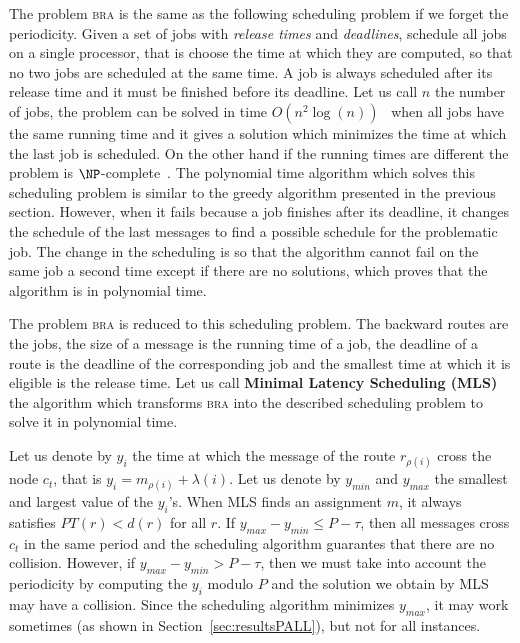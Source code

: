 \documentclass[10pt, conference, letterpaper]{IEEEtran}
\newcommand\bra{\textsc{bra}\xspace}
\begin{document}
     
     The problem \bra is the same as the following scheduling problem if we forget the periodicity. Given a set of jobs with \emph{release times} and  \emph{deadlines}, schedule all jobs on a single processor, that is choose the time at which they are computed, so that no two jobs are scheduled at the same time. A job is always scheduled after its release time and it must be finished before its deadline. Let us call $n$ the number of jobs, the problem can be solved in time $O(n^2\log(n))$~\cite{simons1978fast} when all jobs have the same running time and it gives a solution which minimizes the time at which the last job is scheduled. On the other hand if the running times are different the problem is $\NP$-complete~\cite{lenstra1977complexity}. 
     The  polynomial time algorithm  which solves this scheduling problem is similar to the greedy algorithm presented in the previous section. However, when it fails because a job finishes after its deadline, it changes the schedule of the last messages to find a possible schedule for the problematic job. The change in the scheduling is so that the algorithm cannot fail on the same job a second time except if there are no solutions, which proves that the algorithm is in polynomial time.
     
     The problem \bra is reduced to this scheduling problem. The backward routes are the jobs, the size of a message is the running time of a job, the deadline of a route is the deadline of the corresponding job and the smallest time at which it is eligible is the release time. Let us call {\bf Minimal Latency Scheduling (MLS)} the algorithm which transforms \bra into the described scheduling problem to solve it in polynomial time.
     
     Let us denote by $y_i$ the time at which the message of the route $r_{\rho(i)}$ cross the node $c_t$,
     that is $y_i = m_{\rho(i)} + \lambda(i)$. Let us denote by $y_{min}$ and $y_{max}$ the smallest and largest value of the $y_i$'s. When MLS finds an assignment $m$, it always satisfies $PT(r) < d(r)$ for all $r$. If $y_{max}- y_{min} \leq P -\tau $, then all messages cross $c_t$ in the same period and 
     the scheduling algorithm guarantes that there are no collision. However, if $y_{max}- y_{min} > P -\tau $, then we must take into account the periodicity by computing the $y_i$ modulo $P$ and the solution we obtain by MLS may have a collision. Since the scheduling algorithm minimizes $y_{max}$, it may work sometimes (as shown in Section~\ref{sec:resultsPALL}), but not for all instances. 
     
\end{document}
